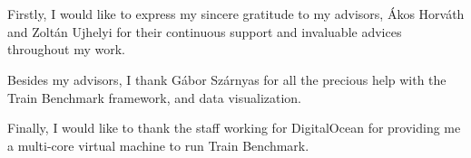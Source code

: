 \chapter*{\koszonetnyilvanitas} %

Firstly, I would like to express my sincere gratitude to my advisors, Ákos Horváth and Zoltán Ujhelyi for their continuous support and invaluable advices throughout my work.

Besides my advisors, I thank Gábor Szárnyas for all the precious help with the Train Benchmark framework, and data visualization.

Finally, I would like to thank the staff working for DigitalOcean for providing me a multi-core virtual machine to run Train Benchmark.

